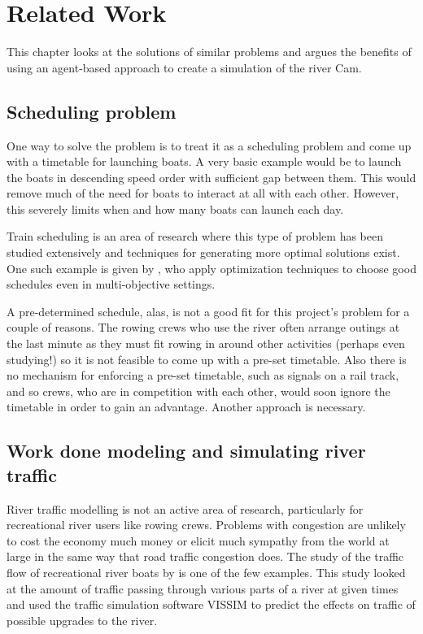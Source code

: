 \chapter{Related Work}\label{chapter:background}
  This chapter looks at the solutions of similar problems and argues the benefits of using an agent-based approach to create a simulation of the river Cam.

  \section{Scheduling problem}
    One way to solve the problem is to treat it as a scheduling problem and come up with a timetable for launching boats. A very basic example would be to launch the boats in descending speed order with sufficient gap between them. This would remove much of the need for boats to interact at all with each other. However, this severely limits when and how many boats can launch each day. 
    
    Train scheduling is an area of research where this type of problem has been studied extensively and techniques for generating more optimal solutions exist. One such example is given by \textcite{Ghoseiri2004}, who apply optimization techniques to choose good schedules even in multi-objective settings. 
    
    A pre-determined schedule, alas, is not a good fit for this project's problem for a couple of reasons. The rowing crews who use the river often arrange outings at the last minute as they must fit rowing in around other activities (perhaps even studying!) so it is not feasible to come up with a pre-set timetable. Also there is no mechanism for enforcing a pre-set timetable, such as signals on a rail track, and so crews, who are in competition with each other, would soon ignore the timetable in order to gain an advantage. Another approach is necessary.

  \section{Work done modeling and simulating river traffic}
  River traffic modelling is not an active area of research, particularly for recreational river users like rowing crews. Problems with congestion are unlikely to cost the economy much money or elicit much sympathy from the world at large in the same way that road traffic congestion does. The study of the traffic flow of recreational river boats by \textcite{Lowry2011} is one of the few examples. This study looked at the amount of traffic passing through various parts of a river at given times and used the traffic simulation software VISSIM to predict the effects on traffic of possible upgrades to the river. 
  
